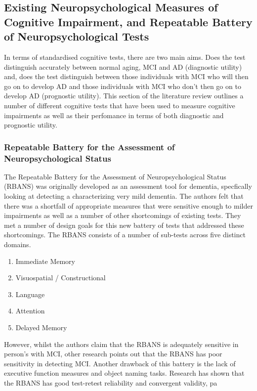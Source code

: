 \documentclass{article}
\begin{document}
\subsection{Existing Neuropsychological Measures of Cognitive Impairment, and Repeatable Battery of Neuropsychological Tests}
In terms of standardised cognitive tests, there are two main aims. Does the test distinguish accurately between normal aging, MCI and AD (diagnostic utility) and, does the test distinguish between those individuals with MCI who will then go on to develop AD and those individuals with MCI who don't then go on to develop AD (prognostic utility). This section of the literature review outlines a number of different cognitive tests that have been used to measure cognitive impairments as well as their perfomance in terms of both diagnostic and prognostic utility.
\par 
\subsubsection{Repeatable Battery for the Assessment of Neuropsychological Status}
The Repeatable Battery for the Assessment of Neuropsychological Status (RBANS) was originally developed as an assessment tool for dementia, specfically looking at detecting a characterizing very mild dementia. The authors felt that there was a shortfall of appropriate measures that were sensitive enough to milder impairments as well as a number of other shortcomings of existing tests. They met a number of design goals for this new battery of tests that addressed these shortcomings. The RBANS consists of a number of sub-tests across five distinct domains.

\begin{enumerate}
	\item Immediate Memory 
	\item Visuospatial / Constructional
	\item Language
	\item Attention
	\item Delayed Memory 
\end{enumerate}

However, whilst the authors claim that the RBANS is adequately sensitive in person's with MCI, other research points out that the RBANS has poor sensitivity in detecting MCI. Another drawback of this battery is the lack of executive function measures and object naming tasks. Research has shown that the RBANS has good test-retest reliability and convergent validity, pa
\end{document}

